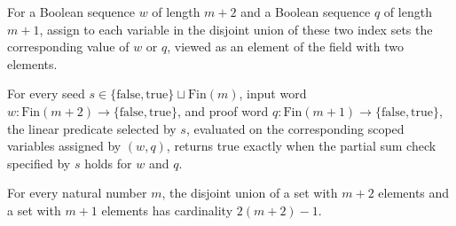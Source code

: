 \begin{definition}
\label{FABL.oddWeightPartialSumCSPAssignment}
\leanok
{}
For a Boolean sequence $w$ of length $m+2$ and a Boolean sequence $q$ of length $m+1$,
assign to each variable in the disjoint union of these two index sets the corresponding
value of $w$ or $q$, viewed as an element of the field with two elements.
\end{definition}

\begin{theorem}
\label{FABL.oddWeightPartialSumCSPPredicate_eval}
\leanok
{}
For every seed $s\in\{\mathrm{false},\mathrm{true}\}\sqcup\mathrm{Fin}(m)$, input word
$w:\mathrm{Fin}(m+2)\to\{\mathrm{false},\mathrm{true}\}$, and proof word
$q:\mathrm{Fin}(m+1)\to\{\mathrm{false},\mathrm{true}\}$, the linear predicate selected
by $s$, evaluated on the corresponding scoped variables assigned by $(w,q)$, returns
true exactly when the partial sum check specified by $s$ holds for $w$ and $q$.
\end{theorem}

\begin{theorem}
\label{FABL.card_oddWeightPartialSumVariable}
\leanok
{}
For every natural number $m$, the disjoint union of a set with $m+2$ elements and a set
with $m+1$ elements has cardinality $2(m+2)-1$.
\end{theorem}

